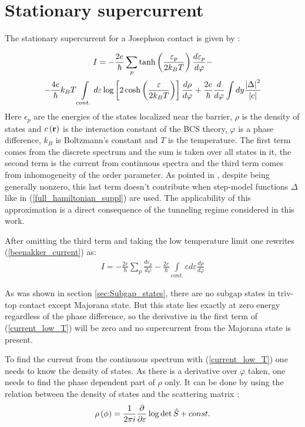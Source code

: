 \section{Stationary supercurrent }

\label{sec:stationary_supercurrent}
The stationary supercurrent for a Josephson contact is given by \cite{Beenakker_three_universal}:

\begin{multline}
\label{beenakker_current}
	I =
	-
	\frac{2e}{\hbar}
	\sum_p
	\tanh\left(\frac{\varepsilon_p}{2k_BT}\right)
	\frac{d \varepsilon_p}{d\varphi}
	-
	\\
	-
	\frac{4e}{\hbar}
k_BT
	\int\limits_{cont.}d\varepsilon \log
	\left[
		2\cosh\left(\frac{\varepsilon}{2k_BT}\right)
	\right]
	\frac{d\rho}{d\varphi}
	+
	\frac{2e}{\hbar}
	\frac{d}{d\varphi}
	\int
	d y
		\frac{\left|\Delta\right|^2}{\left| c\right|}
\end{multline}
Here $ \epsilon_p $ are the energies of the states localized near the barrier, $ \rho$ is the density of states and $ c\left(\textbf{r}\right) $ is the interaction constant of the BCS theory, $ \varphi $ is a phase difference, $ k_B $ is Boltzmann's constant and $ T $ is the temperature.
The first term comes from the discrete spectrum and the sum is taken over all states in it, the second term is the current from continuous spectra and the third  term comes from inhomogeneity of the order parameter. As pointed in \cite{Beenakker_three_universal}, despite being generally nonzero, this last term doesn't contribute when step-model functions $ \Delta $ like in (\ref{full_hamiltonian_suppl})  are used. The applicability of this approximation is a direct consequence of the tunneling regime considered in this work.

After omitting the third term and taking the low temperature limit one rewrites (\ref{beenakker_current}) as:
\begin{gather}
\label{current_low_T}
		I =
		-
	\frac{2e}{\hbar}
	\sum_p
	\frac{d \varepsilon_p}{d\varphi}
	-
	\frac{2e}{\hbar}
	\int\limits_{cont.}\varepsilon d\varepsilon 
	\frac{d\rho}{d\varphi}
\end{gather}

As was shown in section \ref{sec:Subgap_states}, there are no subgap states in triv-top contact except Majorana state. But this state lies exactly at zero energy regardless of the phase difference, so the derivative in the first term of (\ref{current_low_T}) will be zero and no supercurrent from the Majorana state is present. 

To find the current from the continuous spectrum with (\ref{current_low_T}) one needs to know the density of states. As there is a derivative over $ \varphi $ taken, one needs	 to find the phase dependent part of $\rho  $ only. It can be done by using the relation between the density of states and the scattering matrix \cite{Akkermans_Avron_Shapiro_scattering_matrix}:
\begin{gather}
\label{smatrix_and_DOS}
	\rho\left(\phi\right)=\frac{1}{2\pi i}\frac{\partial}{\partial \varepsilon}\log \det \hat{S} +const.
\end{gather}

